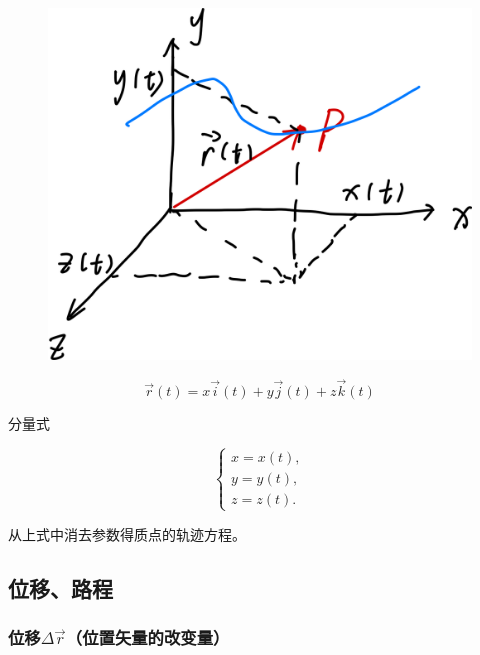 \documentclass[12pt, a4paper]{article}
\begin{document}
    \begin{figure}
        \centering
        \includegraphics[scale=0.08]{"Chapter 01 images/pic2.png"}
        \label{pic2}
    \end{figure}

    \[
        \overrightarrow{r}\left(t\right) = 
        x\overrightarrow{i}\left(t\right) + y\overrightarrow{j}\left(t\right)
        + z\overrightarrow{k}\left(t\right)
    \]

    分量式

    \[
    \begin{cases}
    x = x\left(t\right), \\
    y = y\left(t\right), \\ 
    z = z\left(t\right).
    \end{cases}
    \]

    从上式中消去参数得质点的{\heiti 轨迹方程}。

\subsection{位移、路程}

\subsubsection{位移\(\Delta \overrightarrow{r}\)（位置矢量的改变量）}
\end{document}
